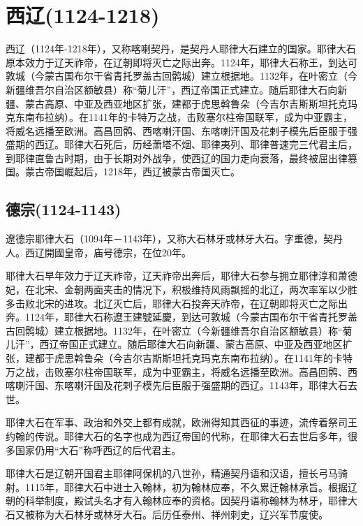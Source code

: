 
\section{西辽\tiny(1124-1218)}

西辽（1124年-1218年），又称喀喇契丹，是契丹人耶律大石建立的国家。耶律大石原本效力于辽天祚帝，在辽朝即将灭亡之际出奔。1124年，耶律大石称王，到达可敦城（今蒙古国布尔干省青托罗盖古回鹘城）建立根据地。1132年，在叶密立（今新疆维吾尔自治区额敏县）称“菊儿汗”，西辽帝国正式建立。随后耶律大石向新疆、蒙古高原、中亚及西亚地区扩张，建都于虎思斡鲁朵（今吉尔吉斯斯坦托克玛克东南布拉纳）。在1141年的卡特万之战，击败塞尔柱帝国联军，成为中亚霸主，将威名远播至欧洲。高昌回鹘、西喀喇汗国、东喀喇汗国及花剌子模先后臣服于强盛期的西辽。耶律大石死后，历经萧塔不烟、耶律夷列、耶律普速完三代君主后，到耶律直鲁古时期，由于长期对外战争，使西辽的国力走向衰落，最终被屈出律篡国。蒙古帝国崛起后，1218年，西辽被蒙古帝国灭亡。

\subsection{德宗\tiny(1124-1143)}

遼德宗耶律大石（1094年－1143年），又称大石林牙或林牙大石。字重德，契丹人。西辽開國皇帝，庙号德宗，在位20年。

耶律大石早年效力于辽天祚帝，辽天祚帝出奔后，耶律大石参与拥立耶律淳和萧德妃，在北宋、金朝两面夹击的情况下，积极维持风雨飘摇的北辽，两次率军以少胜多击败北宋的进攻。北辽灭亡后，耶律大石投奔天祚帝，在辽朝即将灭亡之际出奔。1124年，耶律大石称遼王建號延慶，到达可敦城（今蒙古国布尔干省青托罗盖古回鹘城）建立根据地。1132年，在叶密立（今新疆维吾尔自治区额敏县）称“菊儿汗”，西辽帝国正式建立。随后耶律大石向新疆、蒙古高原、中亚及西亚地区扩张，建都于虎思斡鲁朵（今吉尔吉斯斯坦托克玛克东南布拉纳）。在1141年的卡特万之战，击败塞尔柱帝国联军，成为中亚霸主，将威名远播至欧洲。高昌回鹘、西喀喇汗国、东喀喇汗国及花剌子模先后臣服于强盛期的西辽。1143年，耶律大石去世。

耶律大石在军事、政治和外交上都有成就，欧洲得知其西征的事迹，流传着祭司王约翰的传说。耶律大石的名字也成为西辽帝国的代称，在耶律大石去世后多年，很多国家仍用“大石”称呼西辽的后代君主。

耶律大石是辽朝开国君主耶律阿保机的八世孙，精通契丹语和汉语，擅长弓马骑射。1115年，耶律大石中进士入翰林，初为翰林应奉，不久累迁翰林承旨。根据辽朝的科举制度，殿试头名才有入翰林应奉的资格。因契丹语称翰林为林牙，耶律大石又被称为大石林牙或林牙大石。后历任泰州、祥州刺史，辽兴军节度使。

